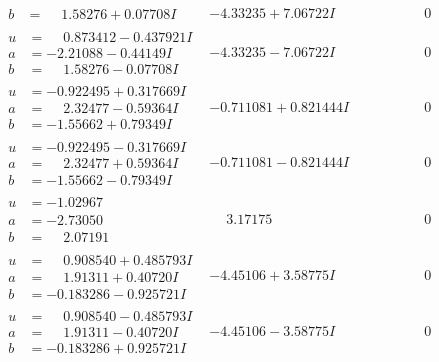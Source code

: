 \documentclass[1p]{elsarticle_modified}
\theoremstyle{definition}
\begin{document}
$$\begin{array}{c|c|c}
\begin{aligned}
b &= \phantom{-}1.58276 + 0.07708 I\end{aligned}
 & -4.33235 + 7.06722 I & \phantom{-0.000000 } 0 \\ \hline\begin{aligned}
u &= \phantom{-}0.873412 - 0.437921 I \\
a &= -2.21088 - 0.44149 I \\
b &= \phantom{-}1.58276 - 0.07708 I\end{aligned}
 & -4.33235 - 7.06722 I & \phantom{-0.000000 } 0 \\ \hline\begin{aligned}
u &= -0.922495 + 0.317669 I \\
a &= \phantom{-}2.32477 - 0.59364 I \\
b &= -1.55662 + 0.79349 I\end{aligned}
 & -0.711081 + 0.821444 I & \phantom{-0.000000 } 0 \\ \hline\begin{aligned}
u &= -0.922495 - 0.317669 I \\
a &= \phantom{-}2.32477 + 0.59364 I \\
b &= -1.55662 - 0.79349 I\end{aligned}
 & -0.711081 - 0.821444 I & \phantom{-0.000000 } 0 \\ \hline\begin{aligned}
u &= -1.02967\phantom{ +0.000000I} \\
a &= -2.73050\phantom{ +0.000000I} \\
b &= \phantom{-}2.07191\phantom{ +0.000000I}\end{aligned}
 & \phantom{-}3.17175\phantom{ +0.000000I} & \phantom{-0.000000 } 0 \\ \hline\begin{aligned}
u &= \phantom{-}0.908540 + 0.485793 I \\
a &= \phantom{-}1.91311 + 0.40720 I \\
b &= -0.183286 - 0.925721 I\end{aligned}
 & -4.45106 + 3.58775 I & \phantom{-0.000000 } 0 \\ \hline\begin{aligned}
u &= \phantom{-}0.908540 - 0.485793 I \\
a &= \phantom{-}1.91311 - 0.40720 I \\
b &= -0.183286 + 0.925721 I\end{aligned}
 & -4.45106 - 3.58775 I & \phantom{-0.000000 } 0 \\ \hline\begin{aligned}

\end{aligned}
\end{array}$$
\end{document}
